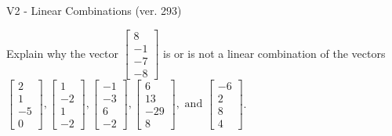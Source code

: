 \begin{exercise}
  \begin{exerciseTitle}V2 - Linear Combinations (ver. 293)\end{exerciseTitle}
  \begin{exerciseStatement}
    Explain why the vector \(\left[\begin{array}{c}
8 \\
-1 \\
-7 \\
-8
\end{array}\right]\)  is or is not a linear 
	combination of the vectors \(\left[\begin{array}{c}
2 \\
1 \\
-5 \\
0
\end{array}\right] , \left[\begin{array}{c}
1 \\
-2 \\
1 \\
-2
\end{array}\right] , \left[\begin{array}{c}
-1 \\
-3 \\
6 \\
-2
\end{array}\right] , \left[\begin{array}{c}
6 \\
13 \\
-29 \\
8
\end{array}\right] , \text{ and } \left[\begin{array}{c}
-6 \\
2 \\
8 \\
4
\end{array}\right]\).
	



\end{exerciseStatement}
\end{exercise}
